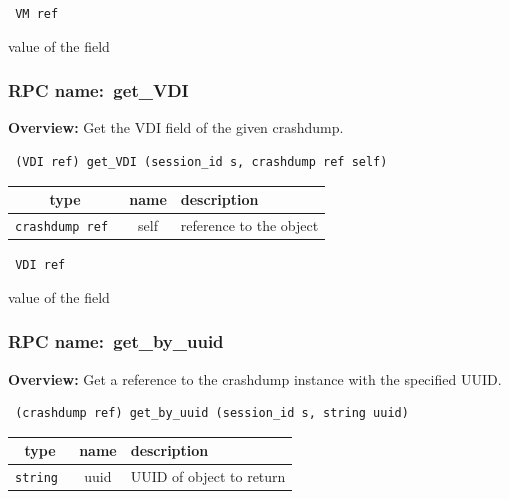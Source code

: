 {\tt 
VM ref
}


value of the field
\vspace{0.3cm}
\vspace{0.3cm}
\vspace{0.3cm}
\subsubsection{RPC name:~get\_VDI}

{\bf Overview:} 
Get the VDI field of the given crashdump.

\begin{verbatim} (VDI ref) get_VDI (session_id s, crashdump ref self)\end{verbatim}



 
\vspace{0.3cm}
\begin{tabular}{|c|c|p{7cm}|}
 \hline
{\bf type} & {\bf name} & {\bf description} \\ \hline
{\tt crashdump ref } & self & reference to the object \\ \hline 

\end{tabular}

\vspace{0.3cm}

{\tt 
VDI ref
}


value of the field
\vspace{0.3cm}
\vspace{0.3cm}
\vspace{0.3cm}
\subsubsection{RPC name:~get\_by\_uuid}

{\bf Overview:} 
Get a reference to the crashdump instance with the specified UUID.

\begin{verbatim} (crashdump ref) get_by_uuid (session_id s, string uuid)\end{verbatim}



 
\vspace{0.3cm}
\begin{tabular}{|c|c|p{7cm}|}
 \hline
{\bf type} & {\bf name} & {\bf description} \\ \hline
{\tt string } & uuid & UUID of object to return \\ \hline 

\end{tabular}

